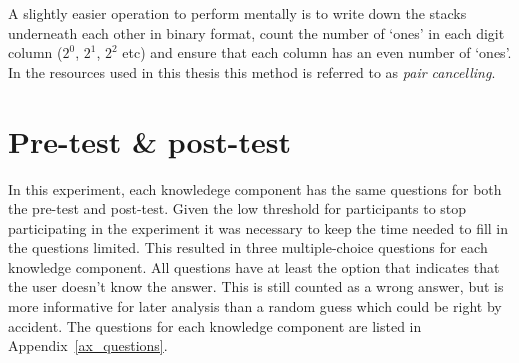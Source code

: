 A slightly easier operation to perform mentally is to write down the stacks
underneath each other in binary format, count the number of `ones' in each
digit column ($2^0$, $2^1$, $2^2$ etc) and ensure that each column has an even
number of `ones'. In the resources used in this thesis this method is referred
to as \emph{pair cancelling}.
\section{Pre-test \& post-test}
\label{sec:setup_tests}
In this experiment, each knowledege component has the same questions for both
the pre-test and post-test. Given the low threshold for participants to stop
participating in the experiment it was necessary to keep the time needed to
fill in the questions limited. This resulted in three multiple-choice
questions for each knowledge component. All questions have at least the option that
indicates that the user doesn't know the answer. This is still counted as a
wrong answer, but is more informative for later analysis than a random guess
which could be right by accident. The questions for each knowledge component
are listed in Appendix~\ref{ax_questions}.

